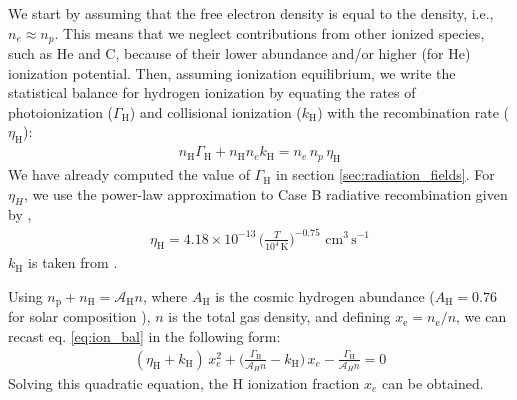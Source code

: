 We start by assuming that the free electron density is equal to the \HI density, i.e., $n_e \approx n_p$. This means that we neglect contributions from other ionized species, such as He and C, because of their lower abundance and/or higher (for He) ionization potential. Then, assuming ionization equilibrium, we write the statistical balance for hydrogen ionization by equating the rates of photoionization ($\Gamma_{\mathrm{H}}$) and collisional ionization ($k_{\mathrm{H}}$) with the recombination rate ($\eta_{\mathrm{H}}$):
\begin{align}
n_\mathrm{H} \Gamma_{\mathrm{H}} + n_\mathrm{H} n_e k_{\mathrm{H}} = n_e\, n_{p} \,\eta_{\mathrm{H}}
\label{eq:ion_bal}
\end{align}
We have already computed the value of $\Gamma_\mathrm{H}$ in section \ref{sec:radiation_fields}. For $\eta_H$, we use the power-law approximation to Case B radiative recombination given by \citet{tielens2005book},
\begin{align}
\eta_\mathrm{H} = 4.18 \times 10^{-13} \, \bigg(\frac{T}{10^4 \, \mathrm{K}}\bigg)^{-0.75} \,\, \mathrm{cm}^3\, \mathrm{s}^{-1}
\label{eq:beta_H}
\end{align}
$k_\mathrm{H}$ is taken from \citet[][Appendix B]{bovino:2016aa}.

Using $n_\mathrm{p} + n_\mathrm{H} = \mathcal{A}_\mathrm{H} n$, where $A_\mathrm{H}$ is the cosmic hydrogen abundance ($A_{\mathrm{H}} = 0.76$ for solar composition \citep{asplund2009}), $n$ is the total gas density, and defining $x_\mathrm{e}=n_\mathrm{e}/n$, we can recast eq. \ref{eq:ion_bal} in the following form:
\begin{align}
(\eta_\mathrm{H}+k_\mathrm{H})\,x_e^2 + \bigg(\frac{\Gamma_{\mathrm{H}}}{\mathcal{A}_H n}-k_\mathrm{H}\bigg)\,x_e - \frac{\Gamma_\mathrm{H}}{\mathcal{A}_H n}= 0
\label{eq:ne}
\end{align}
Solving this quadratic equation, the H ionization fraction $x_e$ can be obtained. 
 
